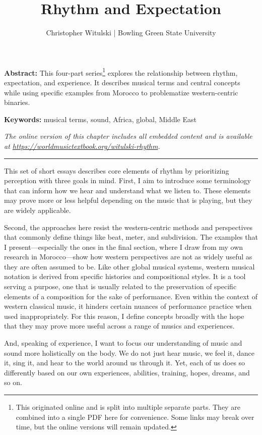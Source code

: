 \documentclass[twoside]{article}
\title{Rhythm and Expectation}
\author{Christopher Witulski | Bowling Green State University}
\date{}
\makeatletter
\renewcommand{\maketitle}{\bgroup\setlength{\parindent}{0pt}
\begin{flushleft}
  \vspace*{3\baselineskip}
  \huge{\textbf{\@title}}

  \medskip
  
  \large{\@author}
\end{flushleft}\egroup
}
\providecommand{\abstracttext}[1]
{
  \noindent
  \textbf{Abstract:} #1
}
\providecommand{\keywords}[1]
{
  \newline
  \textbf{Keywords:} #1
}
\providecommand{\wmturl}{\href{https://worldmusictextbook.org/witulski-rhythm}{https://worldmusictextbook.org/witulski-rhythm}}
\providecommand{\wmturltext}{
  \noindent\emph{The online version of this chapter includes all embedded content and is available at \wmturl.}
}
\makeatother
\begin{document}
\suppressfloats %
\maketitle

\abstracttext{This four-part series\footnote{This originated online and is split into multiple separate parts. They are combined into a single PDF here for convenience. Some links may break over time, but the online versions will remain updated.} explores the relationship between rhythm, expectation, and experience. It describes musical terms and central concepts while using specific examples from Morocco to problematize western-centric binaries.}
\keywords{musical terms, sound, Africa, global, Middle East}

\smallskip

\wmturltext

\medskip

\noindent\hfil\rule{0.5\textwidth}{0.4pt}\hfil

\bigskip

This set of short essays describes core elements of rhythm by
prioritizing perception with three goals in mind. First, I aim to
introduce some terminology that can inform how we hear and understand
what we listen to. These elements may prove more or less helpful
depending on the music that is playing, but they are widely applicable.

Second, the approaches here resist the western-centric methods and
perspectives that commonly define things like beat, meter, and
subdivision. The examples that I present---especially the ones in the
final section, where I draw from my own research in Morocco---show how
western perspectives are not as widely useful as they are often assumed
to be. Like other global musical systems, western musical notation is
derived from specific histories and compositional styles. It is a tool
serving a purpose, one that is usually related to the preservation of
specific elements of a composition for the sake of performance. Even
within the context of western classical music, it hinders certain
nuances of performance practice when used inappropriately. For this
reason, I define concepts broadly with the hope that they may prove more
useful across a range of musics and experiences.

And, speaking of experience, I want to focus our understanding of music
and sound more holistically on the body. We do not just hear music, we
feel it, dance it, sing it, and hear to the world around us through it.
Yet, each of us does so differently based on our own experiences,
abilities, training, hopes, dreams, and so on.
\end{document}
